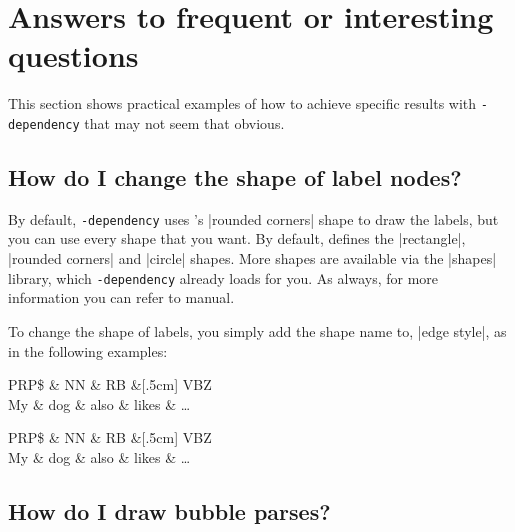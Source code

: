 \documentclass[a4paper]{ltxdoc}
\def\pkgname{\tikzname{}\texttt{-dependency}}
\begin{document}
\section{Answers to frequent or interesting questions}

This section shows practical examples of how to achieve specific results with \pkgname{} that may not seem that obvious.

\subsection{How do I change the shape of label nodes?}

By default, \pkgname{} uses \tikzname{}'s |rounded corners| shape to draw the labels, but you can use every shape that you want. By default, \tikzname{} defines the |rectangle|, |rounded corners| and |circle| shapes. More shapes are available via the |shapes| library, which \pkgname{} already loads for you. As always, for more information you can refer to \tikzname{} manual.

To change the shape of labels, you simply add the shape name to, |edge style|, as in the following examples:

\begin{codeexample}[]
\begin{dependency}[label style = {circle}]
   \begin{deptext}[column sep=.5cm, row sep=.1ex]
      PRP\$ \& NN \& RB \&[.5cm] VBZ \\
      My \& dog \& also \& likes \& \dots \\
   \end{deptext}
\end{dependency}
\qquad
\begin{dependency}[label style = {trapezium}]
   \begin{deptext}[column sep=.5cm, row sep=.1ex]
      PRP\$ \& NN \& RB \&[.5cm] VBZ \\
      My \& dog \& also \& likes \& \dots \\
   \end{deptext}
\end{dependency}
\end{codeexample}

\subsection{How do I draw bubble parses?}
\end{document}
